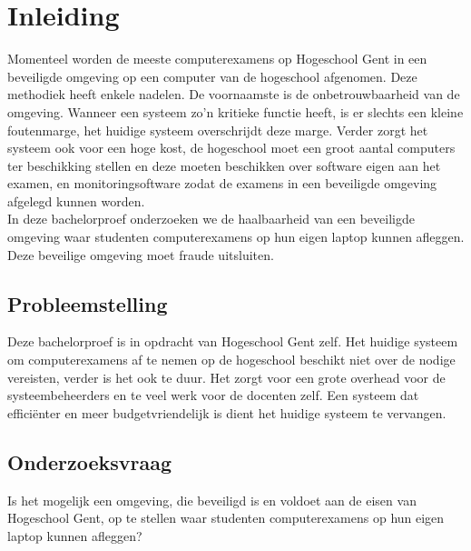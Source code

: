 
\chapter{Inleiding}
\label{ch:inleiding}



 Momenteel worden de meeste computerexamens op Hogeschool Gent in een beveiligde omgeving op een computer van de hogeschool afgenomen. Deze methodiek heeft enkele nadelen. De voornaamste is de onbetrouwbaarheid van de omgeving. Wanneer een systeem zo'n kritieke functie heeft, is er slechts een kleine foutenmarge, het huidige systeem overschrijdt deze marge.  Verder zorgt het systeem ook voor een hoge kost, de hogeschool moet een groot aantal computers ter beschikking stellen en deze moeten beschikken over software eigen aan het examen, en monitoringsoftware zodat de examens in een beveiligde omgeving afgelegd kunnen worden. \\ In deze bachelorproef onderzoeken we de haalbaarheid van een beveiligde omgeving waar studenten computerexamens op hun eigen laptop kunnen afleggen. Deze beveilige omgeving moet fraude uitsluiten. \\


\section{Probleemstelling}
\label{sec:probleemstelling}

Deze bachelorproef is in opdracht van Hogeschool Gent zelf. Het huidige systeem om computerexamens af te nemen op de hogeschool beschikt niet over de nodige vereisten, verder is het ook te duur. Het zorgt voor een grote overhead voor de systeembeheerders en te veel werk voor de docenten zelf. Een systeem dat effici\"{e}nter en meer budgetvriendelijk is dient het huidige systeem te vervangen.



\section{Onderzoeksvraag}
\label{sec:onderzoeksvraag}
Is het mogelijk een omgeving, die beveiligd is en voldoet aan de eisen van Hogeschool Gent, op te stellen waar studenten computerexamens op hun eigen laptop kunnen afleggen? 

